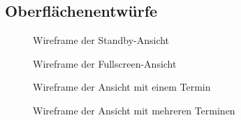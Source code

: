 \subsection{Oberflächenentwürfe}
\label{app:Entwuerfe}
\begin{figure}[htb]
\centering
{}
\caption{Wireframe der Standby-Ansicht}
\end{figure}

\begin{figure}[htb]
\centering
{}
\caption{Wireframe der Fullscreen-Ansicht}
\end{figure}

\begin{figure}[htb]
\centering
{}
\caption{Wireframe der Ansicht mit einem Termin}
\end{figure}

\begin{figure}[htb]
    \centering
    \caption{Wireframe der Ansicht mit mehreren Terminen}
\end{figure}
